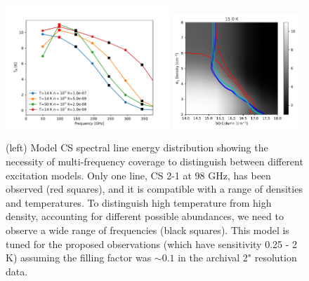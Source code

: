 \documentclass[12pt,a4paper]{article}  %
\newcommand{\percc}{\ensuremath{\mathrm{cm}^{-3}}\xspace}
\begin{document}
% 

\begin{figure}
    \centering
    \includegraphics[width=0.55\textwidth]{figures/proposal_figures/CS_RADEX_models_withobs.pdf}
    \includegraphics[width=0.42\textwidth]{figures/RADEX_SOratio_model_T=15.0.pdf}
    \caption{(left) Model CS spectral line energy distribution showing the necessity of multi-frequency coverage to distinguish between different excitation models.
    Only one line, CS 2-1 at 98 GHz, has been observed (red squares), and it is compatible with a range of densities and temperatures.
    To distinguish high temperature from high density, accounting for different possible abundances, we need to observe a wide range of frequencies (black squares).
    This model is tuned for the proposed observations (which have sensitivity 0.25 - 2 K) assuming the filling factor was $\sim0.1$ in the archival 2" resolution data.
}
\end{figure}
\end{document}
